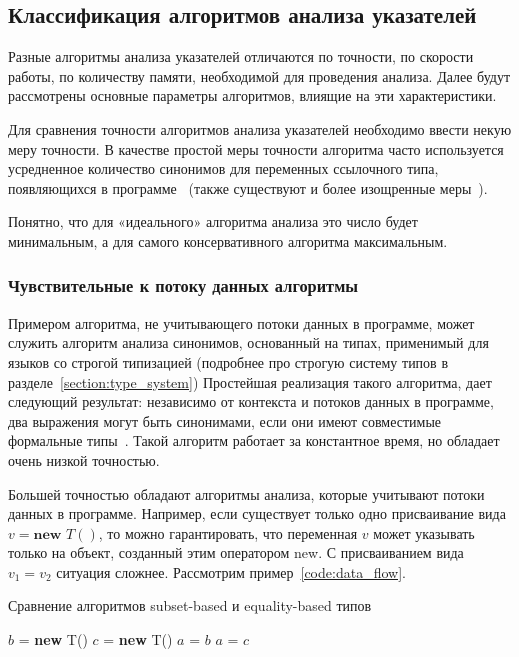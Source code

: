 \documentclass[14pt,titlepage]{extarticle}
\newcommand{\NEW}{\textbf{new }}
\newcommand{\eng}[1]{{\English#1}}
\begin{document}
    \subsection{Классификация алгоритмов анализа указателей}
    \label{section:analysis_classification}

      Разные алгоритмы анализа указателей отличаются по точности, по скорости
      работы, по количеству памяти, необходимой для проведения анализа.
      Далее будут рассмотрены основные параметры алгоритмов, влиящие на эти
      характеристики.

      Для сравнения точности алгоритмов анализа указателей необходимо ввести
      некую меру точности. В качестве простой меры точности алгоритма часто
      используется усредненное количество синонимов для переменных ссылочного
      типа, появляющихся в
      программе~\cite[раздел~3.2]{hind_pointer_analysis_not_solved_yet}
      (также существуют и более изощренные
      меры~\cite{hind_pointer_analysis_not_solved_yet,diwan_tbaa}).

      Понятно, что для «идеального» алгоритма анализа это число будет
      минимальным, а для самого консервативного алгоритма максимальным.

      \subsubsection{Чувствительные к потоку данных алгоритмы}
        \label{section:analysis_classification_data_flow}

        Примером алгоритма, не учитывающего потоки данных в программе, может
        служить алгоритм анализа синонимов, основанный на типах, применимый
        для языков со строгой типизацией (подробнее про строгую систему типов в
        разделе~\ref{section:type_system})
        Простейшая реализация такого алгоритма, дает следующий результат:
        независимо от контекста и потоков данных в программе, два выражения
        могут быть синонимами, если они имеют совместимые формальные
        типы~\cite[раздел~2.2]{diwan_tbaa}.
        Такой алгоритм работает за константное время, но обладает очень низкой
        точностью.

        Большей точностью обладают алгоритмы анализа, которые учитывают потоки
        данных в программе.
        Например, если существует только одно присваивание вида $v = \NEW T()$,
        то можно гарантировать, что переменная $v$ может указывать только на
        объект, созданный этим оператором \eng{new}.
        С присваиванием вида $v_1 = v_2$ ситуация сложнее. Рассмотрим
        пример~\ref{code:data_flow}.
        \begin{algorithm}
          \caption{Сравнение алгоритмов \eng{subset-based} и
                                        \eng{equality-based} типов}
          \label{code:data_flow}
          \begin{algorithmic}[1]
            \STATE $b$ = \NEW T()
            \STATE $c$ = \NEW T()
            \STATE $a$ = $b$
            \STATE $a$ = $c$
          \end{algorithmic}
        \end{algorithm}
\end{document}
